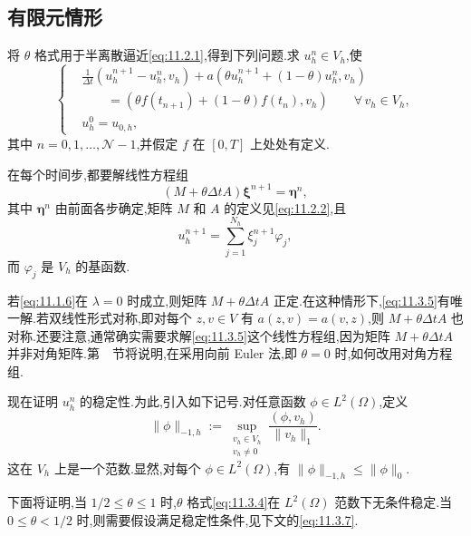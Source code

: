 \subsection{有限元情形}\label{sec:11.3.1}

将 \(\theta\) 格式用于半离散逼近\eqref{eq:11.2.1},得到下列问题.求 \(u_h^n\in V_h\),使
\begin{equation}\label{eq:11.3.4}
  \left\{
  \begin{aligned}
    &\frac1{\Delta t}(u_h^{n+1}-u_h^n,v_h)
          +a(\theta u_h^{n+1}+(1-\theta)u_h^n,v_h)\\
    &\qquad=(\theta f(t_{n+1})+(1-\theta)f(t_n),v_h)
                   \qquad\forall\,v_h\in V_h,\\
    &u_h^0=u_{0,h},
  \end{aligned}
  \right.
\end{equation}
其中 \(n=0,1,\ldots,\mathcal N-1\),并假定 \(f\) 在 \([0,T]\) 上处处有定义.

在每个时间步,都要解线性方程组
\begin{equation}\label{eq:11.3.5}
  (M+\theta\Delta t A)\boldsymbol{\xi}^{n+1}=\boldsymbol{\eta}^n,
\end{equation}
其中 \(\boldsymbol{\eta}^n\) 由前面各步确定,矩阵 \(M\) 和 \(A\) 的定义见\eqref{eq:11.2.2},且
\[
  u_h^{n+1}=\sum_{j=1}^{N_h}\xi_j^{n+1}\varphi_j,
\]
而 \(\varphi_j\) 是 \(V_h\) 的基函数.

若\eqref{eq:11.1.6}在 \(\lambda=0\) 时成立,则矩阵 \(M+\theta\Delta t A\) 正定.在这种情形下,\eqref{eq:11.3.5}有唯一解.若双线性形式对称,即对每个 \(z,v\in V\) 有 \(a(z,v)=a(v,z)\),则 \(M+\theta\Delta t A\) 也对称.还要注意,通常确实需要求解\eqref{eq:11.3.5}这个线性方程组,因为矩阵 \(M+\theta\Delta t A\) 并非对角矩阵.第~~节将说明,在采用向前 Euler 法,即 \(\theta=0\) 时,如何改用对角方程组.

现在证明 \(u_h^n\) 的稳定性.为此,引入如下记号.对任意函数 \(\phi\in L^2(\Omega)\),定义
\begin{equation}\label{eq:11.3.6}
  \|\phi\|_{-1,h}:=\sup_{\substack{v_h\in V_h\\v_h\ne0}}
           \frac{(\phi,v_h)}{\|v_h\|_1}.
\end{equation}
这在 \(V_h\) 上是一个范数.显然,对每个 \(\phi\in L^2(\Omega)\),有 \(\|\phi\|_{-1,h}\le\|\phi\|_0\).

下面将证明,当 \(1/2\le\theta\le1\) 时,\(\theta\) 格式\eqref{eq:11.3.4}在 \(L^2(\Omega)\) 范数下无条件稳定.当 \(0\le\theta<1/2\) 时,则需要假设满足稳定性条件,见下文的\eqref{eq:11.3.7}.

